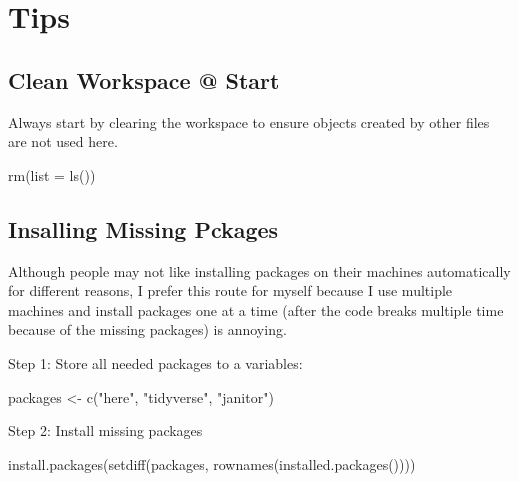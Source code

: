 \documentclass[
  letterpaper,
  DIV=11,
  numbers=noendperiod]{scrreprt}
\newenvironment{Shaded}{\begin{snugshade}}{\end{snugshade}}
\newcommand{\AttributeTok}[1]{\textcolor[rgb]{0.40,0.45,0.13}{#1}}
\newcommand{\FunctionTok}[1]{\textcolor[rgb]{0.28,0.35,0.67}{#1}}
\newcommand{\NormalTok}[1]{\textcolor[rgb]{0.00,0.23,0.31}{#1}}
\newcommand{\OtherTok}[1]{\textcolor[rgb]{0.00,0.23,0.31}{#1}}
\newcommand{\StringTok}[1]{\textcolor[rgb]{0.13,0.47,0.30}{#1}}
\begin{document}
\chapter{Tips}\label{tips}

\section{Clean Workspace @ Start}\label{clean-workspace-start}

Always start by clearing the workspace to ensure objects created by
other files are not used here.

\begin{Shaded}
\begin{Highlighting}[]
\FunctionTok{rm}\NormalTok{(}\AttributeTok{list =} \FunctionTok{ls}\NormalTok{())}
\end{Highlighting}
\end{Shaded}

\section{Insalling Missing Pckages}\label{insalling-missing-pckages}

Although people may not like installing packages on their machines
automatically for different reasons, I prefer this route for myself
because I use multiple machines and install packages one at a time
(after the code breaks multiple time because of the missing packages) is
annoying.

Step 1: Store all needed packages to a variables:

\begin{Shaded}
\begin{Highlighting}[]
\NormalTok{packages }\OtherTok{\textless{}{-}} \FunctionTok{c}\NormalTok{(}\StringTok{"here"}\NormalTok{, }\StringTok{"tidyverse"}\NormalTok{, }\StringTok{"janitor"}\NormalTok{)}
\end{Highlighting}
\end{Shaded}

Step 2: Install missing packages

\begin{Shaded}
\begin{Highlighting}[]
\FunctionTok{install.packages}\NormalTok{(}\FunctionTok{setdiff}\NormalTok{(packages, }\FunctionTok{rownames}\NormalTok{(}\FunctionTok{installed.packages}\NormalTok{())))}
\end{Highlighting}
\end{Shaded}
\end{document}

